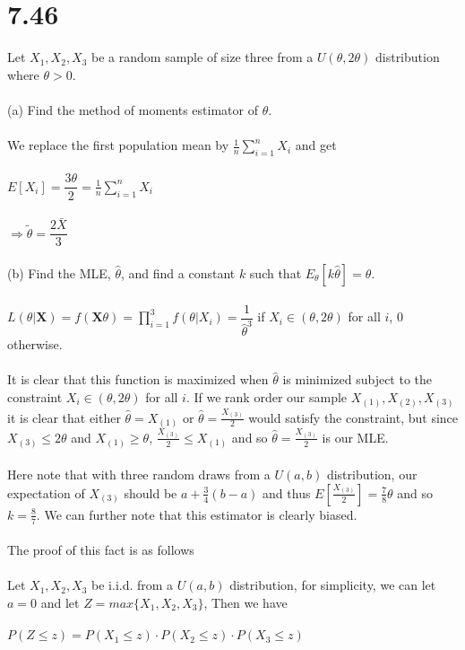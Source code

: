 \documentclass{article}
\begin{document}
\section{7.46}
Let $X_1,X_2,X_3$ be a random sample of size three from a $U(\theta,2\theta)$ distribution where $\theta>0$.\\\\
(a) Find the method of moments estimator of $\theta$.\\\\
We replace the first population mean by $\frac{1}{n}\sum_{i=1}^nX_i$ and get\\\\
$E[X_i]=\dfrac{3\theta}{2}=\frac{1}{n}\sum_{i=1}^nX_i$\\\\
$\Rightarrow \tilde{\theta}=\dfrac{2\bar{X}}{3}$\\\\
(b) Find the MLE, $\hat{\theta}$, and find a constant $k$ such that $E_\theta[k\hat{\theta}]=\theta$.\\\\
$L(\theta|\textbf{X})=f(\textbf{X}\theta)=\prod_{i=1}^3f(\theta|X_i)=\dfrac{1}{\hat{\theta}^3}$ if $X_i\in(\theta,2\theta)$ for all $i$, $0$ otherwise.\\\\
It is clear that this function is maximized when $\hat{\theta}$ is minimized subject to the constraint $X_i\in(\theta,2\theta)$ for all $i$.  If we rank order our sample $X_{(1)},X_{(2)},X_{(3)}$ it is clear that either $\hat{\theta}=X_{(1)}$ or $\hat{\theta}=\frac{X_{(3)}}{2}$ would satisfy the constraint, but since $X_{(3)}\leq2\theta$ and $X_{(1)}\geq\theta$, $\frac{X_{(3)}}{2}\leq X_{(1)}$ and so $\hat{\theta}=\frac{X_{(3)}}{2}$ is our MLE.\\\\
Here note that with three random draws from a $U(a,b)$ distribution, our expectation of $X_{(3)}$ should be $a+\frac{3}{4}(b-a)$ and thus $E[\frac{X_{(3)}}{2}]=\frac{7}{8}\theta$ and so $k=\frac{8}{7}$.  We can further note that this estimator is clearly biased.\\\\
The proof of this fact is as follows\\\\
Let $X_1,X_2,X_3$ be i.i.d. from a $U(a,b)$ distribution, for simplicity, we can let $a=0$ and let $Z=max\{X_1,X_2,X_3\}$, Then we have\\\\
$P(Z\leq z)=P(X_1\leq z)\cdot P(X_2\leq z)\cdot P(X_3\leq z)$\\\\
\end{document}
